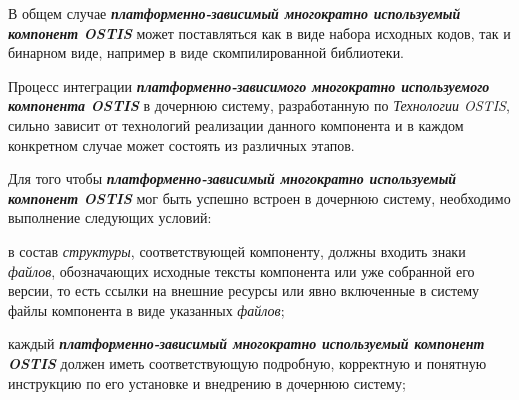 \begin{SCn}
{В общем случае \textbf{\textit{платформенно-зависимый многократно используемый компонент OSTIS}}  может поставляться как в виде набора исходных кодов, так и бинарном виде, например в виде скомпилированной библиотеки.

Процесс интеграции \textbf{\textit{платформенно-зависимого многократно используемого компонента OSTIS}} в дочернюю систему, разработанную по \textit{Технологии OSTIS}, сильно зависит от технологий реализации данного компонента и в каждом конкретном случае может состоять из различных этапов.

Для того чтобы \textbf{\textit{платформенно-зависимый многократно используемый компонент OSTIS}} мог быть успешно встроен в дочернюю систему, необходимо выполнение следующих условий:
\begin{scnitemize}
    \item в состав \textit{структуры}, соответствующей компоненту, должны входить знаки \textit{файлов}, обозначающих исходные тексты компонента или уже собранной его версии, то есть ссылки на внешние ресурсы или явно включенные в систему файлы компонента в виде указанных \textit{файлов};
    \item каждый \textbf{\textit{платформенно-зависимый многократно используемый компонент OSTIS}} должен иметь соответствующую подробную, корректную и понятную инструкцию по его установке и внедрению в дочернюю систему;
\end{scnitemize}
}

\end{SCn}

